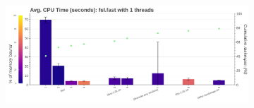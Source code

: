 \documentclass[conference]{IEEEtran}
\begin{document}
\begin{figure}[ht!]
	\centering
																																																																																																															
																																																																																																															
																																																																																																															
	\hfill
	\begin{subfigure}[t]{0.49\textwidth}
		\caption{}
		\label{subfig:hotspots-fsl-fast}
		\includegraphics[width=\textwidth]{figures/hotspots-1thread-fsl-fast.png}
	\end{subfigure}
																																																																																																														

\end{figure}
\end{document}
